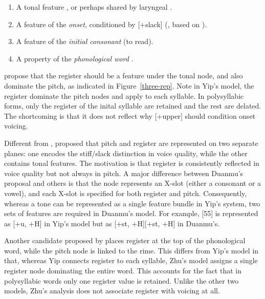 \documentclass[11pt]{article}
\begin{document}
\begin{enumerate} \setlength\itemsep{0em} \setlength\parskip{0em}
	\item A tonal feature \citep{yip1980diss}, or perhaps shared by laryngeal \citep{yip1993tonal}.
	\item A feature of the \textit{onset}, conditioned by [+slack] (\citeauthor{duanmu1988}, based on \citet{bao1999structure}).
	\item A feature of the \textit{initial consonant} \citep{ren1992} (to read).
	\item A property of the \textit{phonological word} \citep{zhu1999shanghai}.
\end{enumerate}



\citet{yip1980diss,yip1993tonal} propose that the register should be a feature 
under the tonal node, and also dominate the pitch, as indicated in 
Figure~\ref{three-rep}. Note in Yip's model, the register dominate the pitch 
nodes and apply to each syllable. In polysyllabic forms, only the register
of the inital syllable are retained and the rest are delated. The shortcoming
is that it does not reflect why [+upper] should condition onset voicing. 

Different from \citet{yip1980diss,yip1993tonal}, \citet{duanmu1988} proposed 
that pitch and register are represented on two separate planes: one encodes the 
stiff/slack distinction in voice quality, while the other contains tonal 
features. The motivation is that register is consistently reflected in voice 
quality but not always in pitch. A major difference between Duanmu’s proposal 
and others is that the node represents an X-slot (either a consonant or a 
vowel), and each X-slot is specified for both register and pitch. Consequently, 
whereas a tone can be represented as a single feature bundle in Yip’s system, 
two sets of features are required in Duanmu’s model. For example, [55] is 
represented as [+u, +H] in Yip’s model but as [+st, +H][+st, +H] in Duanmu’s.

Another candidate proposed by \citet{zhu1999shanghai} places register at the 
top of the phonological word, while the pitch node is linked to the rime. This 
differs from Yip’s model in that, whereas Yip connects register to each 
syllable, Zhu’s model assigns a single register node dominating the entire 
word. This accounts for the fact that in polysyllabic words only one register 
value is retained. Unlike the other two models, Zhu’s analysis does not 
associate register with voicing at all.
\end{document}
